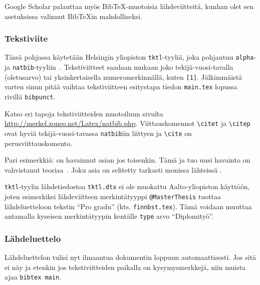 Google Scholar palauttaa myös BibTeX-muotoisia lähdeviitteitä,
kunhan olet sen asetuksissa valinnut BibTeXin mahdolliseksi.

\subsubsection{Tekstiviite}
\label{sec:esimtekstiviite}

Tässä pohjassa käytetään Helsingin yliopiston 
\verb!tktl!-tyyliä, joka pohjautuu \verb!alpha!-
ja \verb!natbib!-tyyliin~\cite{tktl}.
Tekstiviitteet saadaan mukaan joko tekijä-vuosi-tavalla (oletusarvo)
tai yksinkertaisella numeromerkinnällä, kuten \verb![1]!. 
Jälkimmäistä varten sinun pitää vaihtaa tekstiviitteen esitystapa
tiedon \verb!main.tex! lopussa rivillä \verb!bibpunct!. 

\begin{sloppypar}
Katso eri tapoja tekstiviitteiden muotoiluun sivulta
\url{http://merkel.zoneo.net/Latex/natbib.php}.
Viittauskomennot  \verb!\citet! ja \verb!\citep! ovat
hyviä tekijä-vuosi-tavassa \verb!natbib!iin liittyen
ja \verb!\cite! on perusviittauskomento.
\end{sloppypar}

Pari esimerkkiä:
\citet[s. 21]{Teekkari2010} on havainnut asian jos toisenkin. 
Tämä ja tuo uusi havainto on vahvistanut teoriaa~\citep[s. 22]{Teekkari2010}.
Joku asia on selitetty tarkasti monissa lähteissä 
\citep[katso][s. 27]{Teekkari2010}.

\verb!tktl!-tyylin lähdetiedostoa \verb!tktl.dtx! ei ole
muokattu Aalto-yliopiston käyttöön, joten esimerkiksi 
lähdeviitteen merkintätyyppi \verb!@MasterThesis! tuottaa lähdeluetteloon
tekstin ``Pro gradu'' (kts. \verb!finnbst.tex!).
Tämä voidaan muuttaa antamalla kyseisen merkintätyypin kentälle
\verb!type! arvo ``Diplomityö''. 

\subsubsection{Lähdeluettelo}
\label{sec:esimlahdeluettelo}

Lähdeluettelon tulisi nyt ilmaantua dokumentin loppuun
automaattisesti. Jos sitä ei näy ja etenkin jos tekstiviitteiden
paikalla on kysymysmerkkejä, niin muista ajaa \verb!bibtex main!.


